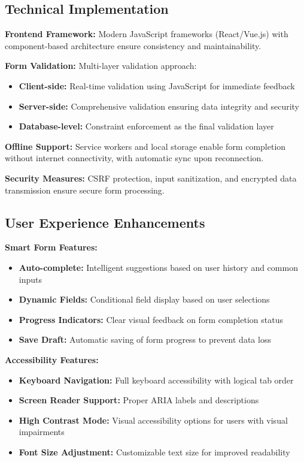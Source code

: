 \documentclass[12pt,a4paper,oneside]{book}
\begin{document}
\subsection{Technical Implementation}

\textbf{Frontend Framework:} Modern JavaScript frameworks (React/Vue.js) with component-based architecture ensure consistency and maintainability.

\textbf{Form Validation:} Multi-layer validation approach:
\begin{itemize}
    \item \textbf{Client-side:} Real-time validation using JavaScript for immediate feedback
    \item \textbf{Server-side:} Comprehensive validation ensuring data integrity and security
    \item \textbf{Database-level:} Constraint enforcement as the final validation layer
\end{itemize}

\textbf{Offline Support:} Service workers and local storage enable form completion without internet connectivity, with automatic sync upon reconnection.

\textbf{Security Measures:} CSRF protection, input sanitization, and encrypted data transmission ensure secure form processing.

\subsection{User Experience Enhancements}

\textbf{Smart Form Features:}
\begin{itemize}
    \item \textbf{Auto-complete:} Intelligent suggestions based on user history and common inputs
    \item \textbf{Dynamic Fields:} Conditional field display based on user selections
    \item \textbf{Progress Indicators:} Clear visual feedback on form completion status
    \item \textbf{Save Draft:} Automatic saving of form progress to prevent data loss
\end{itemize}

\textbf{Accessibility Features:}
\begin{itemize}
    \item \textbf{Keyboard Navigation:} Full keyboard accessibility with logical tab order
    \item \textbf{Screen Reader Support:} Proper ARIA labels and descriptions
    \item \textbf{High Contrast Mode:} Visual accessibility options for users with visual impairments
    \item \textbf{Font Size Adjustment:} Customizable text size for improved readability
\end{itemize}
\end{document}
